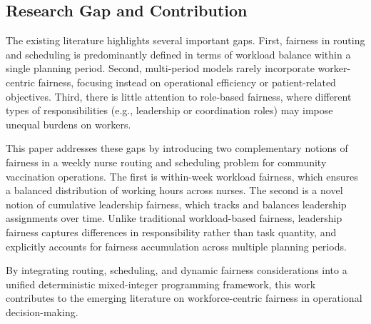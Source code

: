 \subsection{Research Gap and Contribution}

The existing literature highlights several important gaps. First, fairness in routing and scheduling is predominantly defined in terms of workload balance within a single planning period. Second, multi-period models rarely incorporate worker-centric fairness, focusing instead on operational efficiency or patient-related objectives. Third, there is little attention to role-based fairness, where different types of responsibilities (e.g., leadership or coordination roles) may impose unequal burdens on workers.

This paper addresses these gaps by introducing two complementary notions of fairness in a weekly nurse routing and scheduling problem for community vaccination operations. The first is within-week workload fairness, which ensures a balanced distribution of working hours across nurses. The second is a novel notion of cumulative leadership fairness, which tracks and balances leadership assignments over time. Unlike traditional workload-based fairness, leadership fairness captures differences in responsibility rather than task quantity, and explicitly accounts for fairness accumulation across multiple planning periods.

By integrating routing, scheduling, and dynamic fairness considerations into a unified deterministic mixed-integer programming framework, this work contributes to the emerging literature on workforce-centric fairness in operational decision-making.